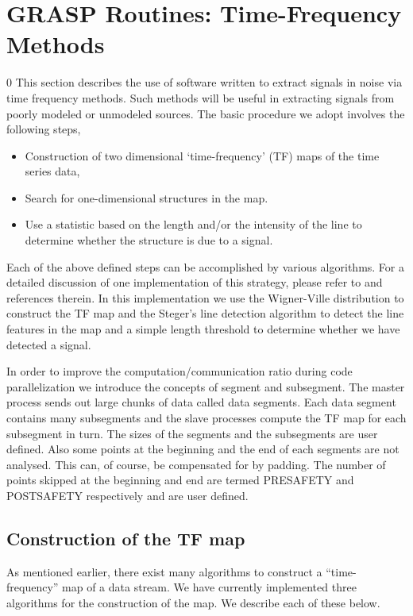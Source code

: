 \section{GRASP Routines: Time-Frequency Methods}
\label{s:tfmethods}
\setcounter{equation}0
This section describes the use of software written to extract signals
in noise via time frequency methods. Such methods will be useful in
extracting signals from poorly modeled or unmodeled sources.
The basic procedure we adopt involves the following steps,
\begin{itemize}
\item Construction of two dimensional 
`time-frequency' (TF) maps of the time series data,
\item Search for one-dimensional structures in the map. 
\item Use a statistic based on the length and/or the intensity of the
line to determine whether the structure is due to a signal.
\end{itemize}
Each of the above defined steps can be accomplished by various
algorithms. 
For a detailed discussion of one implementation of  
this strategy, please refer to \cite{timefreqpap} and references
therein. In this implementation we use the Wigner-Ville distribution
to construct the TF map and the Steger's line detection algorithm to
detect the line features in the map and a simple length threshold
to determine whether we have detected a signal.

In order to improve the computation/communication ratio during code
parallelization we introduce the concepts of segment and subsegment. 
The master process sends out large chunks of data called data segments.
Each data segment contains many subsegments  and the slave processes
compute the TF map for each subsegment in turn. The sizes of the
segments and the subsegments are user defined. Also some points at the
beginning and the end of each segments are not analysed. This can, of
course, be compensated for by padding. The number of points skipped
at the beginning and end are termed PRESAFETY and POSTSAFETY
respectively and are user defined.

\subsection{Construction of the TF map}
As mentioned earlier, there exist  many algorithms to construct a
 ``time-frequency'' map of a data stream. We have currently
 implemented three algorithms for the construction of the map. 
 We describe each of these below.

